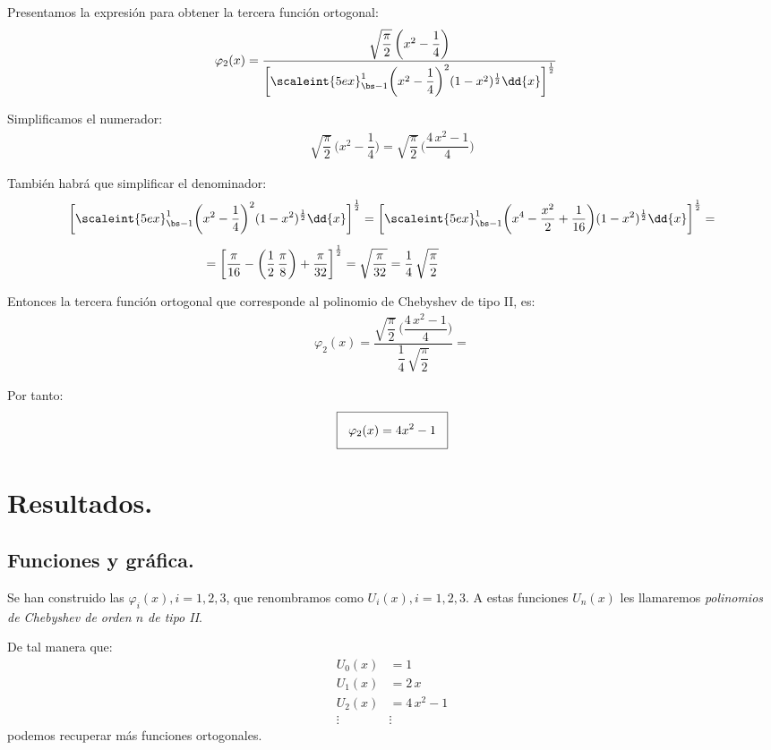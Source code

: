 Presentamos la expresión para obtener la tercera función ortogonal:
\begin{align*}
\varphi_{2}(x) &= \dfrac{\sqrt{\dfrac{\pi}{2}} \, \bigg( x^{2} - \dfrac{1}{4} \bigg)}{ \bigg[ \scaleint{5ex}_{\bs -1}^{1} \bigg( x^{2} - \dfrac{1}{4} \bigg)^{2} (1 -x^{2})^{\frac{1}{2}} \dd{x} \bigg]^{\frac{1}{2}}}
\end{align*}

Simplificamos el numerador:
\begin{align*}
\sqrt{\dfrac{\pi}{2}} \, \bigg( x^{2} - \dfrac{1}{4} \bigg) =  \sqrt{\dfrac{\pi}{2}} \, \bigg( \dfrac{4 \, x^{2} - 1}{4} \bigg) %
\end{align*}

También habrá que simplificar el denominador:
\begin{align*}
\bigg[ \scaleint{5ex}_{\bs -1}^{1} \bigg( &x^{2} - \dfrac{1}{4} \bigg)^{2} (1 -x^{2})^{\frac{1}{2}} \dd{x} \bigg]^{\frac{1}{2}} = \bigg[ \scaleint{5ex}_{\bs -1}^{1} \bigg( x^{4} - \dfrac{x^{2}}{2} + \dfrac{1}{16} \bigg) (1 -x^{2})^{\frac{1}{2}} \dd{x} \bigg]^{\frac{1}{2}} = \\[0.5em] 
&= \bigg[ \dfrac{\pi}{16} - \left( \dfrac{1}{2} \, \dfrac{\pi}{8} \right) + \dfrac{\pi}{32} \bigg]^{\frac{1}{2}} =  \sqrt{\dfrac{\pi}{32}} =  \dfrac{1}{4} \, \sqrt{\dfrac{\pi}{2}}
\end{align*}

Entonces la tercera función ortogonal que corresponde al polinomio de Chebyshev de tipo II, es:
\begin{align*}
\varphi_{2} (x) = \dfrac{\sqrt{\dfrac{\pi}{2}} \,\bigg( \dfrac{4 \, x^{2} - 1}{4} \bigg)}{\dfrac{1}{4} \, \sqrt{\dfrac{\pi}{2}}} = 
\end{align*}

Por tanto:
\begin{align*}
\setlength{\fboxsep}{3\fboxsep}\boxed{
\varphi_{2} (x) = 4 x^{2} - 1
}
\end{align*}

\section{Resultados.}
\subsection{Funciones y gráfica.}

Se han construido las $\varphi_{i}(x), i = 1, 2, 3$, que renombramos como $U_{i}(x), i = 1, 2, 3$. A estas funciones $U_{n}(x)$ les llamaremos \emph{polinomios de Chebyshev de orden $n$ de tipo II}.
\par
De tal manera que:
\begin{align*}
U_{0} (x) &= 1 \\[0.5em]
U_{1} (x) &= 2 \, x \\[0.5em]
U_{2} (x) &= 4 \, x^{2} - 1 \\[0.5em]
\vdots & \vdots
\end{align*}
podemos recuperar más funciones ortogonales.

